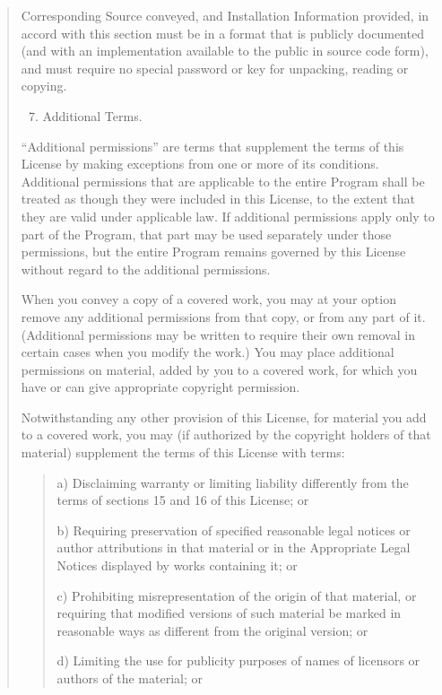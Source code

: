 \documentclass[letterpaper,10pt,english]{sphinxmanual}
\begin{document}
\begin{quote}
Corresponding Source conveyed, and Installation Information provided,
in accord with this section must be in a format that is publicly
documented (and with an implementation available to the public in
source code form), and must require no special password or key for
unpacking, reading or copying.
\begin{enumerate}
\setcounter{enumi}{6}
\item {} 
Additional Terms.

\end{enumerate}

``Additional permissions'' are terms that supplement the terms of this
License by making exceptions from one or more of its conditions.
Additional permissions that are applicable to the entire Program shall
be treated as though they were included in this License, to the extent
that they are valid under applicable law.  If additional permissions
apply only to part of the Program, that part may be used separately
under those permissions, but the entire Program remains governed by
this License without regard to the additional permissions.

When you convey a copy of a covered work, you may at your option
remove any additional permissions from that copy, or from any part of
it.  (Additional permissions may be written to require their own
removal in certain cases when you modify the work.)  You may place
additional permissions on material, added by you to a covered work,
for which you have or can give appropriate copyright permission.

Notwithstanding any other provision of this License, for material you
add to a covered work, you may (if authorized by the copyright holders of
that material) supplement the terms of this License with terms:
\begin{quote}

a) Disclaiming warranty or limiting liability differently from the
terms of sections 15 and 16 of this License; or

b) Requiring preservation of specified reasonable legal notices or
author attributions in that material or in the Appropriate Legal
Notices displayed by works containing it; or

c) Prohibiting misrepresentation of the origin of that material, or
requiring that modified versions of such material be marked in
reasonable ways as different from the original version; or

d) Limiting the use for publicity purposes of names of licensors or
authors of the material; or


\end{quote}
\end{quote}
\end{document}
